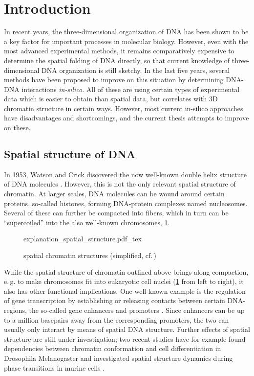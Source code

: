 \section{Introduction}
In recent years, the three-dimensional organization of DNA has been shown to 
be a key factor for important processes in molecular biology.
However, even with the most advanced experimental methods, 
it remains comparatively expensive to determine the spatial folding of DNA directly,
so that current knowledge of three-dimensional DNA organization is still sketchy.
In the last five years, several methods have been proposed to improve on this situation
by determining DNA-DNA interactions \emph{in-silico}.
All of these are using certain types of experimental data which is easier to obtain than spatial data, but correlates with 3D chromatin structure in certain ways.
However, most current in-silico approaches have disadvantages and shortcomings,
and the current thesis attempts to improve on these.

\subsection{Spatial structure of DNA}
In 1953, Watson and Crick discovered the now well-known double helix structure of DNA molecules \cite{Watson1953}.
However, this is not the only relevant spatial structure of chromatin. 
At larger scales, DNA molecules can be wound around certain proteins, so-called histones, forming DNA-protein complexes named nucleosomes.
Several of these can further be compacted into fibers, which in turn can be ``supercoiled'' into the also well-known chromosomes, \cref{fig:intro:spatial_chrom_structures}.
\begin{figure}[h!]
 \small
 \centering
 {explanation_spatial_structure.pdf_tex}
 \caption{spatial chromatin structures (simplified, cf.\,\cite{Lee2001})} \label{fig:intro:spatial_chrom_structures}
\end{figure}

While the spatial structure of chromatin outlined above brings along compaction, 
e.\,g. to make chromosomes fit into eukaryotic cell nuclei (\cref{fig:intro:spatial_chrom_structures} from left to right), 
it also has other functional implications.
One well-known example is the regulation of gene transcription by establishing or releasing contacts
between certain DNA-regions, the so-called gene enhancers and promoters \cite{Smallwood2013,Gorkin2014}.
Since enhancers can be up to a million basepairs away from the corresponding promoters, 
the two can usually only interact by means of spatial DNA structure.
Further effects of spatial structure are still under investigation;
two recent studies have for example found dependencies between chromatin conformation 
and cell differentiation in Drosophila Melanogaster \cite{Chathoth2019}
and investigated spatial structure dynamics during phase transitions in murine cells \cite{Zhang2019b}.


